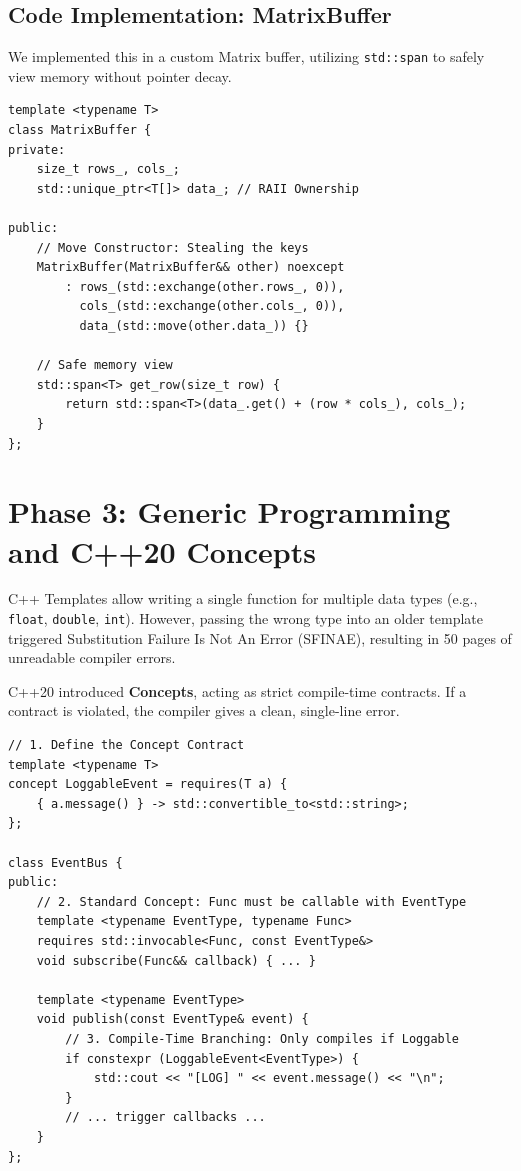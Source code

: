 \documentclass[11pt,a4paper]{article}
\begin{document}
\subsection{Code Implementation: MatrixBuffer}
We implemented this in a custom Matrix buffer, utilizing \texttt{std::span} to safely view memory without pointer decay.

\begin{lstlisting}[caption={Phase 2: RAII, Move Semantics, and \texttt{std::span}}]
template <typename T>
class MatrixBuffer {
private:
    size_t rows_, cols_;
    std::unique_ptr<T[]> data_; // RAII Ownership

public:
    // Move Constructor: Stealing the keys
    MatrixBuffer(MatrixBuffer&& other) noexcept 
        : rows_(std::exchange(other.rows_, 0)),
          cols_(std::exchange(other.cols_, 0)),
          data_(std::move(other.data_)) {}

    // Safe memory view
    std::span<T> get_row(size_t row) {
        return std::span<T>(data_.get() + (row * cols_), cols_);
    }
};
\end{lstlisting}

\section{Phase 3: Generic Programming and C++20 Concepts}
C++ Templates allow writing a single function for multiple data types (e.g., \texttt{float}, \texttt{double}, \texttt{int}). However, passing the wrong type into an older template triggered Substitution Failure Is Not An Error (SFINAE), resulting in 50 pages of unreadable compiler errors.

C++20 introduced \textbf{Concepts}, acting as strict compile-time contracts. If a contract is violated, the compiler gives a clean, single-line error.

\begin{lstlisting}[caption={Phase 3: Generic Event Dispatcher with Concepts}]
// 1. Define the Concept Contract
template <typename T>
concept LoggableEvent = requires(T a) {
    { a.message() } -> std::convertible_to<std::string>;
};

class EventBus {
public:
    // 2. Standard Concept: Func must be callable with EventType
    template <typename EventType, typename Func>
    requires std::invocable<Func, const EventType&>
    void subscribe(Func&& callback) { ... }

    template <typename EventType>
    void publish(const EventType& event) {
        // 3. Compile-Time Branching: Only compiles if Loggable
        if constexpr (LoggableEvent<EventType>) {
            std::cout << "[LOG] " << event.message() << "\n";
        }
        // ... trigger callbacks ...
    }
};
\end{lstlisting}
\end{document}

